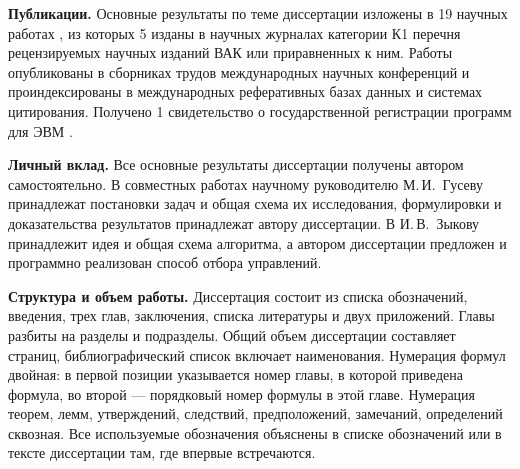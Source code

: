 \documentclass[../main.tex]{subfiles}
\begin{document}
\textbf{Публикации.} 
 Основные результаты по теме диссертации изложены в 19 научных работах \cite{AIP,GusevOsipovTrudy,OsipovVoronezhAbstract,OsipovAIPAbstract, SubbotinConf, Osipov, Voronezh, Minskconf, GusevOsipov, GusevOsipovPyat, GusevOsipovOCTA, GusevOsipovPyatAbstract, OsipovNLA, OsipovSopromat2022, GusevOsipovMotor, OsipovUMJ, OsipovSopromat2023, OsipovVSPU2024, OsipovSopromat2024}, из которых 5 изданы в научных журналах категории К1 \cite{GusevOsipovTrudy, Osipov, Voronezh, GusevOsipov, OsipovUMJ} перечня рецензируемых научных изданий ВАК или приравненных к ним. 
 Работы \cite{AIP, GusevOsipovMotor, GusevOsipovPyat} опубликованы в сборниках трудов международных
 научных конференций и проиндексированы в международных реферативных базах данных и системах цитирования.
Получено 1 свидетельство о государственной регистрации программ для ЭВМ \cite{Patent}.


\textbf{Личный вклад.} 
Все основные результаты диссертации получены автором самостоятельно. 
В совместных работах \cite{GusevOsipovTrudy, AIP, GusevOsipov, GusevOsipovMotor, GusevOsipovPyat, OsipovAIPAbstract, GusevOsipovPyatAbstract, SubbotinConf, Minskconf, GusevOsipovOCTA} научному руководителю М.\,И.~Гусеву принадлежат постановки задач и общая схема их исследования, формулировки и доказательства результатов принадлежат автору диссертации. 
В \cite{Patent} И.\,В.~Зыкову принадлежит идея и общая схема алгоритма, а автором диссертации предложен и программно реализован способ отбора управлений. 

\textbf{Структура и объем работы.}
Диссертация состоит из списка обозначений, введения, трех глав, заключения, списка литературы и двух приложений. 
Главы разбиты на разделы и подразделы.
Общий объем диссертации составляет \pageref{LastPage} страниц, библиографический список включает  наименования. 
Нумерация формул двойная: в первой позиции указывается номер главы, в которой приведена формула, во второй — порядковый номер формулы в этой главе. 
Нумерация теорем, лемм, утверждений, следствий, предположений, замечаний, определений сквозная. 
Все используемые обозначения объяснены в списке обозначений или в тексте диссертации там, где впервые встречаются.
\end{document}
